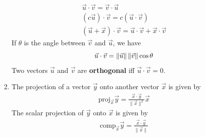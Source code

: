 \documentclass[10pt]{article}
\begin{document}
\begin{multicols}{2}
\begin{enumerate}
\begin{enumerate}
\begin{align*}
        \vec{u} \cdot \vec{v} = \vec{v} \cdot \vec{u} \\
        (c\vec{u}) \cdot \vec{v} = c(\vec{u} \cdot \vec{v}) \\
        (\vec{u} + \vec{x}) \cdot \vec{v} = \vec{u} \cdot \vec{v} + \vec{x} \cdot \vec{v}
    \end{align*}
    If $\theta$ is the angle between $\vec{v}$ and $\vec{u}$, we have
    \begin{equation*}
        \vec{u} \cdot \vec{v} = \| \vec{u} \| \hspace{.5mm} \| \vec{v} \| \cos{\theta}
    \end{equation*}
    Two vectors $\vec{u}$ and $\vec{v}$ are \textbf{orthogonal} iff $\vec{u} \cdot \vec{v} = 0$.
    \item The projection of a vector $\vec{y}$ onto another vector $\vec{x}$ is given by
    \begin{align*}
        \text{proj}_{\vec{x}} \vec{y} = \frac{\vec{x} \cdot \vec{y}}{\| \vec{x} \|^2}\vec{x}
    \end{align*}
    The scalar projection of $\vec{y}$ onto $\vec{x}$ is given by
    \begin{align*}
        \text{comp}_{\vec{x}} \vec{y} = \frac{\vec{x} \cdot \vec{y}}{\| \vec{x} \|}
    \end{align*}
    

\end{enumerate}
\end{enumerate}
\end{multicols}
\end{document}
